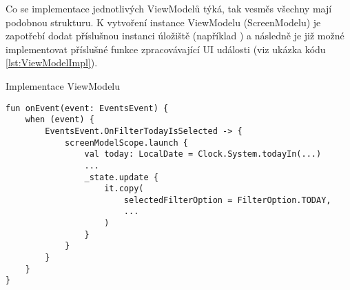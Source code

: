 Co se implementace jednotlivých ViewModelů týká, tak vesměs všechny mají podobnou strukturu. K vytvoření instance ViewModelu (ScreenModelu)
je zapotřebí dodat příslušnou instanci úložiště (například ) a následně je již možné implementovat příslušné funkce
zpracovávající UI události (viz ukázka kódu \ref{lst:ViewModelImpl}). 


\begin{listing}[H]
\caption{Implementace ViewModelu}\label{lst:ViewModelImpl}
\begin{verbatim}
fun onEvent(event: EventsEvent) {
    when (event) {
        EventsEvent.OnFilterTodayIsSelected -> {
            screenModelScope.launch {
                val today: LocalDate = Clock.System.todayIn(...)
                ...
                _state.update {
                    it.copy(
                        selectedFilterOption = FilterOption.TODAY,
                        ...
                    )
                }
            }
        }
    }
}
\end{verbatim}
\end{listing}




